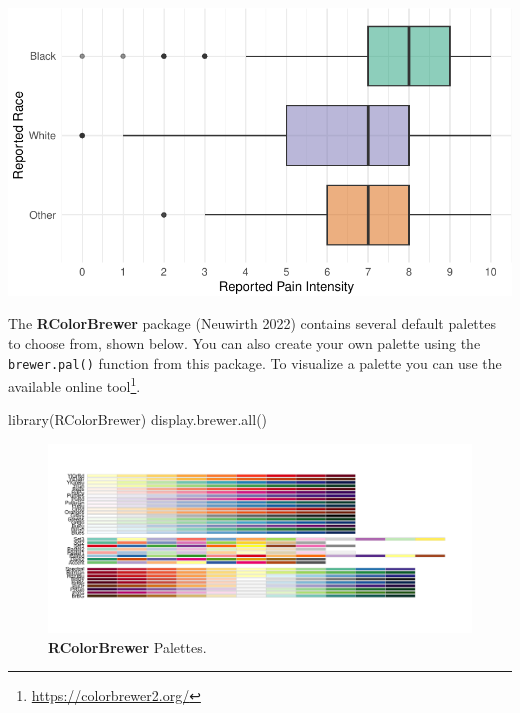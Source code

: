 \documentclass[
  letterpaper,
]{krantz}
\makeatletter
\newenvironment{Shaded}{\begin{snugshade}}{\end{snugshade}}
\newcommand{\FunctionTok}[1]{\textcolor[rgb]{0.28,0.35,0.67}{#1}}
\newcommand{\NormalTok}[1]{\textcolor[rgb]{0.00,0.23,0.31}{#1}}
\renewcommand{\href}[2]{#2\footnote{\url{#1}}}
\newenvironment{kframe}{%
\medskip{}
\setlength{\fboxsep}{.8em}
 \def\at@end@of@kframe{}%
 \ifinner\ifhmode%
  \def\at@end@of@kframe{\end{minipage}}%
  \begin{minipage}{\columnwidth}%
 \fi\fi%
 \def\FrameCommand##1{\hskip\@totalleftmargin \hskip-\fboxsep
 \colorbox{shadecolor}{##1}\hskip-\fboxsep
     \hskip-\linewidth \hskip-\@totalleftmargin \hskip\columnwidth}%
 \MakeFramed {\advance\hsize-\width
   \@totalleftmargin\z@ \linewidth\hsize
   \@setminipage}}%
 {\par\unskip\endMakeFramed%
 \at@end@of@kframe}
\renewenvironment{Shaded}{\begin{kframe}}{\end{kframe}}
\makeatother
\begin{document}
\begin{center}
\includegraphics[width=1\textwidth,height=\textheight]{book/visualization_ggplot_files/figure-pdf/unnamed-chunk-13-1.pdf}
\end{center}

The \textbf{RColorBrewer} package (Neuwirth 2022) contains several
default palettes to choose from, shown below. You can also create your
own palette using the \texttt{brewer.pal()} function from this package.
To visualize a palette you can use the available
\href{https://colorbrewer2.org/}{online tool}.

\begin{Shaded}
\begin{Highlighting}[]
\FunctionTok{library}\NormalTok{(RColorBrewer)}
\FunctionTok{display.brewer.all}\NormalTok{()}
\end{Highlighting}
\end{Shaded}

\begin{figure}[H]

{\centering \includegraphics[width=1\textwidth,height=\textheight]{book/images/visualization_ggplot/palettes.png}

}

\caption{\textbf{RColorBrewer} Palettes.}

\end{figure}%
\end{document}
